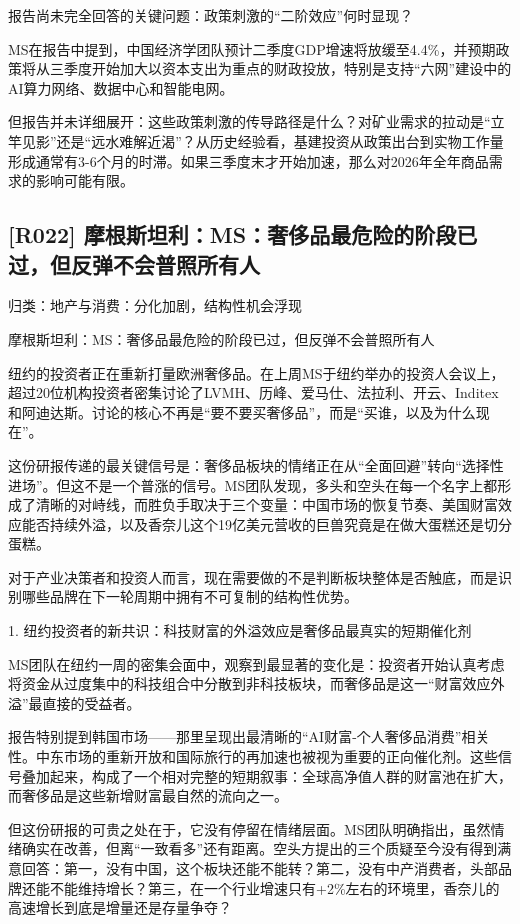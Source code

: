 \documentclass[11pt]{ctexart}
\begin{document}
报告尚未完全回答的关键问题：政策刺激的“二阶效应”何时显现？

MS在报告中提到，中国经济学团队预计二季度GDP增速将放缓至4.4\%，并预期政策将从三季度开始加大以资本支出为重点的财政投放，特别是支持“六网”建设中的AI算力网络、数据中心和智能电网。

但报告并未详细展开：这些政策刺激的传导路径是什么？对矿业需求的拉动是“立竿见影”还是“远水难解近渴”？从历史经验看，基建投资从政策出台到实物工作量形成通常有3-6个月的时滞。如果三季度末才开始加速，那么对2026年全年商品需求的影响可能有限。

\subsection{[R022] 摩根斯坦利：MS：奢侈品最危险的阶段已过，但反弹不会普照所有人}
{\small\color{refgray}归类：地产与消费：分化加剧，结构性机会浮现}

摩根斯坦利：MS：奢侈品最危险的阶段已过，但反弹不会普照所有人

纽约的投资者正在重新打量欧洲奢侈品。在上周MS于纽约举办的投资人会议上，超过20位机构投资者密集讨论了LVMH、历峰、爱马仕、法拉利、开云、Inditex和阿迪达斯。讨论的核心不再是“要不要买奢侈品”，而是“买谁，以及为什么现在”。

这份研报传递的最关键信号是：奢侈品板块的情绪正在从“全面回避”转向“选择性进场”。但这不是一个普涨的信号。MS团队发现，多头和空头在每一个名字上都形成了清晰的对峙线，而胜负手取决于三个变量：中国市场的恢复节奏、美国财富效应能否持续外溢，以及香奈儿这个19亿美元营收的巨兽究竟是在做大蛋糕还是切分蛋糕。

对于产业决策者和投资人而言，现在需要做的不是判断板块整体是否触底，而是识别哪些品牌在下一轮周期中拥有不可复制的结构性优势。

1. 纽约投资者的新共识：科技财富的外溢效应是奢侈品最真实的短期催化剂

MS团队在纽约一周的密集会面中，观察到最显著的变化是：投资者开始认真考虑将资金从过度集中的科技组合中分散到非科技板块，而奢侈品是这一“财富效应外溢”最直接的受益者。

报告特别提到韩国市场——那里呈现出最清晰的“AI财富-个人奢侈品消费”相关性。中东市场的重新开放和国际旅行的再加速也被视为重要的正向催化剂。这些信号叠加起来，构成了一个相对完整的短期叙事：全球高净值人群的财富池在扩大，而奢侈品是这些新增财富最自然的流向之一。

但这份研报的可贵之处在于，它没有停留在情绪层面。MS团队明确指出，虽然情绪确实在改善，但离“一致看多”还有距离。空头方提出的三个质疑至今没有得到满意回答：第一，没有中国，这个板块还能不能转？第二，没有中产消费者，头部品牌还能不能维持增长？第三，在一个行业增速只有+2\%左右的环境里，香奈儿的高速增长到底是增量还是存量争夺？
\end{document}

